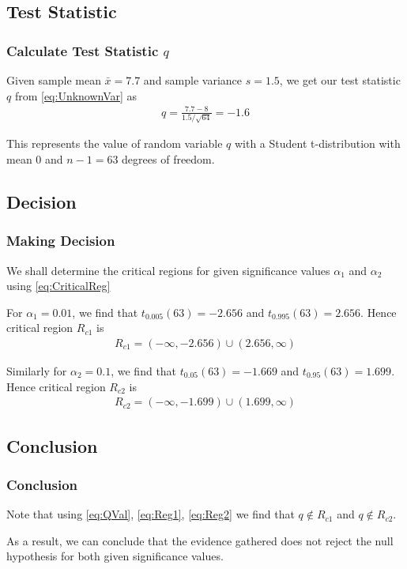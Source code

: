 \documentclass{beamer}
\begin{document}
\subsection{Test Statistic}
\begin{frame}
	\frametitle{Calculate Test Statistic $q$}
	Given sample mean $\bar{x} = 7.7$ and sample variance $s = 1.5 $, we get our test statistic $q$ from
	\eqref{eq:UnknownVar}
	as
	\begin{align}
		q = \frac{7.7 - 8}{1.5/\sqrt{64}} = -1.6
		\label{eq:QVal}
	\end{align}

	This represents the value of random variable $q$ with a Student t-distribution with mean $0$ and $n-1 = 63$ degrees of freedom.
\end{frame}

\subsection{Decision}
\begin{frame}
	\frametitle{Making Decision}
	We shall determine the critical regions for given significance values $\alpha_1$ and $\alpha_2$ using
	\eqref{eq:CriticalReg}

	For $\alpha_1 = 0.01$, we find that $t_{0.005}(63) = -2.656$ and $t_{0.995}(63) = 2.656$. Hence critical region $R_{c1}$ is
	\begin{align}
		R_{c1} = (-\infty, -2.656) \cup (2.656, \infty)
		\label{eq:Reg1}
	\end{align}

	Similarly for $\alpha_2 = 0.1$, we find that $t_{0.05}(63) = -1.669$ and $t_{0.95}(63) = 1.699$. Hence critical region $R_{c2}$ is
	\begin{align}
		R_{c2} = (-\infty, -1.699) \cup (1.699, \infty)
		\label{eq:Reg2}
	\end{align}
	
\end{frame}

\subsection{Conclusion}
\begin{frame}
	\frametitle{Conclusion}
	Note that using 
	\eqref{eq:QVal}, \eqref{eq:Reg1}, \eqref{eq:Reg2}
	we find that $q \notin R_{c1}$ and $q \notin R_{c2}$.

	As a result, we can conclude that the evidence gathered does not reject the null hypothesis for both given significance values.
\end{frame}
\end{document}

